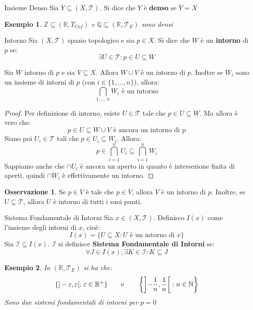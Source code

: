 \documentclass[11pt,a4paper,twoside]{article}
\newtheorem{es}{Esempio}
\theoremstyle{definition}
\newtheorem*{oss}{Osservazione}
\begin{document}
\begin{defn}{Insieme Denso}{}
	Sia $Y \subseteq (X, \mathcal T)$. Si dice che $Y$ è \textbf{denso} se $\overline Y = X$
\end{defn}

\begin{es}
	$\mathbb Z \subseteq (\mathbb R, T_{Cof})$ e $\mathbb Q \subseteq (\mathbb R, \mathcal T_E)$ sono densi
\end{es}

\begin{defn}{Intorno}{}
	Sia $(X, \mathcal T)$ spazio topologico e sia $p \in X$. Si dice che $W$ è un \textbf{intorno} di $p$ se:
	\[\exists U \in \mathcal T: p \in U \subseteq W\]
\end{defn}

\begin{lemma}{}{}
	Sia $W$ intorno di $p$ e sia $V \subseteq X$. Allora $W \cup V$ è un intorno di $p$. Inoltre se $W_i$ sono un insieme di intorni di $p$ (con $i \in \{1,...,n\}$), allora:
	\[ \bigcap_{1,...,n}W_i \text{ è un intorno}\]
\end{lemma}

\begin{proof}
	Per definizione di intorno, esiste $U \in \mathcal T$ tale che $p \in U \subseteq W$. Ma allora è vero che:
	\[ p \in U \subseteq W \cup V \text{ è ancora un intorno di p}\]
	Siano poi $U_i \in \mathcal T$ tali che $p \in U_i \subseteq W_i$. Allora:
	\[ p \in \bigcap_{i = 1}^n U_i \subseteq \bigcap_{i = 1}^n W_i\]
	Sappiamo anche che $\cap U_i$ è ancora un aperto in quanto è intersezione finita di aperti, quindi $\cap W_i$ è effettivamente un intorno.
\end{proof}

\begin{oss}
	Se $p \in V$ è tale che $p \in \mathring V$, allora $V$ è un intorno di $p$. Inoltre, se $U \subseteq \mathcal T$, allora $U$ è intorno di tutti i suoi punti.
\end{oss}

\begin{defn}{Sistema Fondamentale di Intorni}{}
	Sia $x \in (X, \mathcal T)$. Definisco $I(x)$ come l'insieme degli intorni di $x$, cioè:
	\[ I(x) = \{ U \subseteq X: U \text{ è un intorno di }x \} \]
	Sia $\mathcal I \subseteq I(x)$. $\mathcal I$ si definisce \textbf{Sistema Fondamentale di Intorni} se:
	\[\forall J \in I(x), \exists K \in \mathcal I: K\subseteq J\]
\end{defn}

\begin{es}
	In $(\mathbb R, \mathcal T_E)$ si ha che:
	\[ \{]-\varepsilon, \varepsilon[: \varepsilon \in \mathbb R^+\} \qquad \text e \qquad \left\{\left] -\frac 1n, \frac 1n \right[: n \in \mathbb N \right\}\]
	Sono due sistemi fondamentali di intorni per $p = 0$
\end{es}
\end{document}
